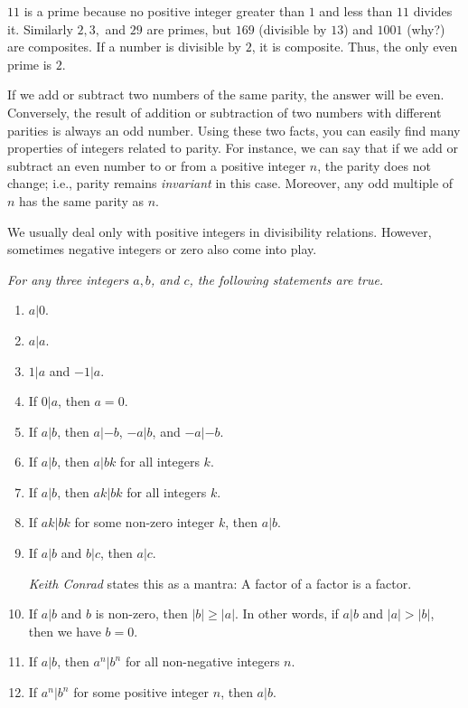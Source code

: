 \documentclass{subfile}
\begin{document}
	\begin{example}
		$11$ is a prime because no positive integer greater than $1$ and less than $11$ divides it. Similarly $2,3,$ and $29$ are primes, but $169$ (divisible by $13$) and $1001$ (why?) are composites. If a number is divisible by $2$, it is composite. Thus, the only even prime is $2$.
	\end{example}

	If we add or subtract two numbers of the same parity, the answer will be even. Conversely, the result of addition or subtraction of two numbers with different parities is always an odd number. Using these two facts, you can easily find many properties of integers related to parity. For instance, we can say that if we add or subtract an even number to or from a positive integer $n$, the parity does not change; i.e., parity remains {\it invariant} in this case. Moreover, any odd multiple of $n$ has the same parity as $n$.

	We usually deal only with positive integers in divisibility relations. However, sometimes negative integers or zero also come into play.

	\begin{proposition}\slshape\label{prop:basicdiv}
		For any three integers $a,b$, and $c$, the following statements are true.
		\begin{enumerate}
			\item $a|0$.
			\item $a|a$.
			\item $1|a$ and $-1|a$.
			\item If $0|a$, then $a=0$.
			\item If $a|b$, then $a|-b$, $-a|b$, and $-a|-b$.
			\item If $a|b$, then $a|bk$ for all integers $k$.
			\item If $a|b$, then $ak|bk$ for all integers $k$.
			\item If $ak|bk$ for some non-zero integer $k$, then $a|b$.
			\item If $a|b$ and $b|c$, then $a|c$.

			\textit{Keith Conrad} states this as a mantra: A factor of a factor is a factor.
			\item If $a|b$ and $b$ is non-zero, then $|b| \geq |a|$. In other words, if $a|b$ and $|a|>|b|$, then we have $b=0$.
			\item If $a|b$, then $a^n|b^n$ for all non-negative integers $n$.
			\item If $a^n | b^n$ for some positive integer $n$, then $a|b$.
		\end{enumerate}

	\end{proposition}
\end{document}

